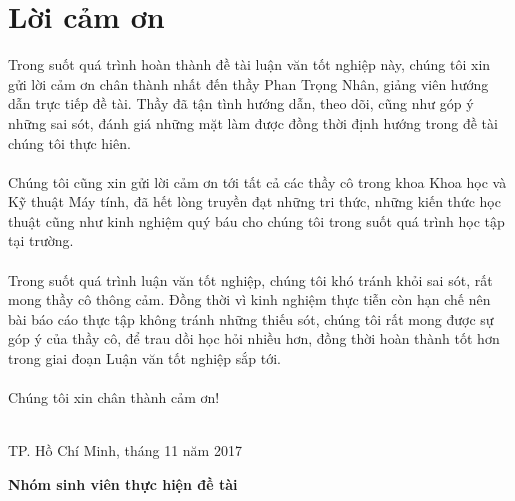 \documentclass[a4paper]{article}
\begin{document}
\section*{Lời cảm ơn}
Trong suốt quá trình hoàn thành đề tài luận văn tốt nghiệp này, chúng tôi xin gửi lời cảm ơn chân thành nhất đến thầy Phan Trọng Nhân, giảng viên hướng dẫn trực tiếp đề tài. Thầy đã tận tình hướng dẫn, theo dõi, cũng như góp ý những sai sót, đánh  giá những mặt làm được đồng thời định hướng trong đề tài chúng tôi thực hiên.\\
\\
Chúng tôi cũng xin gửi lời cảm ơn tới tất cả các thầy cô trong khoa Khoa học và Kỹ thuật Máy tính, đã hết lòng truyền đạt những tri thức, những kiến thức học thuật cũng như kinh nghiệm quý báu cho chúng tôi trong suốt quá trình học tập tại trường.\\
\\
Trong suốt quá trình luận văn tốt nghiệp, chúng tôi khó tránh khỏi sai sót, rất mong thầy cô thông cảm. Đồng thời vì kinh nghiệm thực tiễn còn hạn chế nên bài báo cáo thực tập không tránh những thiếu sót, chúng tôi rất mong được sự góp ý của thầy cô, để trau dồi học hỏi nhiều hơn, đồng thời hoàn thành tốt hơn trong giai đoạn Luận văn tốt nghiệp sắp tới.\\
\\
Chúng tôi xin chân thành cảm ơn!\\
\\
\begin{flushright}
    TP. Hồ Chí Minh, tháng 11 năm 2017 \\
                  
\end{flushright}
\begin{flushright}
    \textbf{Nhóm sinh viên thực hiện đề tài}
\end{flushright}

\newpage
\tableofcontents
\newpage
\listoffigures
\newpage
\listoftables
\newpage
\end{document}
